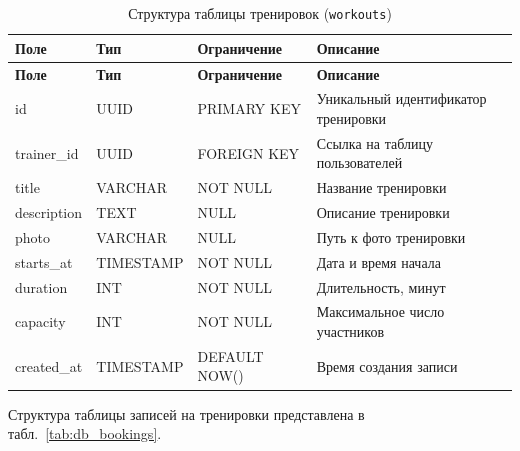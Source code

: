 \begin{longtable}{|l|l|p{3.5cm}|p{5.5cm}|}
    \caption{Структура таблицы тренировок (\texttt{workouts})} \label{tab:db_workouts} \\

    \hline
    \textbf{Поле} & \textbf{Тип} & \textbf{Ограничение} & \textbf{Описание} \\ \hline
    \endfirsthead

    \tabcont{\ref{tab:db_workouts}}
    \textbf{Поле} & \textbf{Тип} & \textbf{Ограничение} & \textbf{Описание} \\ \hline
    \endhead

    \hline
    \endfoot

    \hline
    \endlastfoot

    id          & UUID      & PRIMARY KEY   & Уникальный идентификатор тренировки   \\ \hline
    trainer\_id & UUID      & FOREIGN KEY   & Ссылка на таблицу пользователей       \\ \hline
    title       & VARCHAR   & NOT NULL      & Название тренировки                   \\ \hline
    description & TEXT      & NULL          & Описание тренировки                   \\ \hline
    photo       & VARCHAR   & NULL          & Путь к фото тренировки                \\ \hline
    starts\_at  & TIMESTAMP & NOT NULL      & Дата и время начала                   \\ \hline
    duration    & INT       & NOT NULL      & Длительность, минут                   \\ \hline
    capacity    & INT       & NOT NULL      & Максимальное число участников         \\ \hline
    created\_at & TIMESTAMP & DEFAULT NOW() & Время создания записи                 \\ \hline
\end{longtable}

Структура таблицы записей на тренировки представлена в табл.~\ref{tab:db_bookings}.

